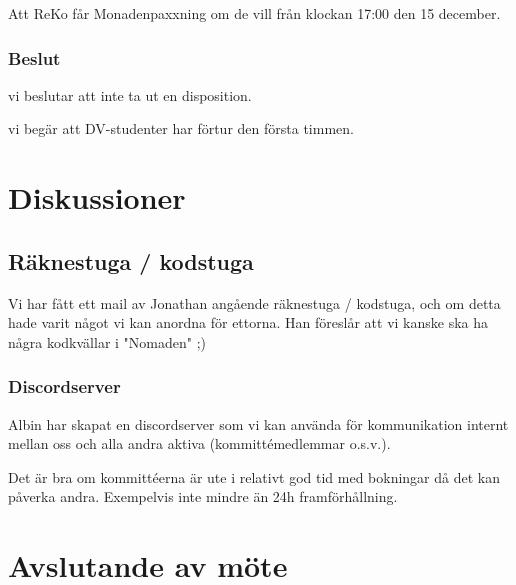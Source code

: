\documentclass[protokoll]{dvd}
\begin{document}
            \begin{attsatser}
                \item Att ReKo får Monadenpaxxning om de vill från klockan 17:00 den 15 december.
            \end{attsatser}
            \subsubsection*{Beslut}
            \begin{attsatser}
                \item vi beslutar att inte ta ut en disposition.
                \item vi begär att DV-studenter har förtur den första timmen.
            \end{attsatser}


\newpage

\section{Diskussioner}\label{sec:discussioner}

    \subsection{Räknestuga / kodstuga}
         Vi har fått ett mail av Jonathan angående räknestuga / kodstuga, och om detta hade varit något vi kan anordna för ettorna.
         Han föreslår att vi kanske ska ha några kodkvällar i "Nomaden" ;)

    \subsubsection{Discordserver}
        Albin har skapat en discordserver som vi kan använda för kommunikation internt mellan oss och alla andra aktiva (kommittémedlemmar o.s.v.).

        Det är bra om kommittéerna är ute i relativt god tid med bokningar då det kan påverka andra. Exempelvis inte mindre än 24h framförhållning.

\newpage

\section{Avslutande av möte}
\end{document}
